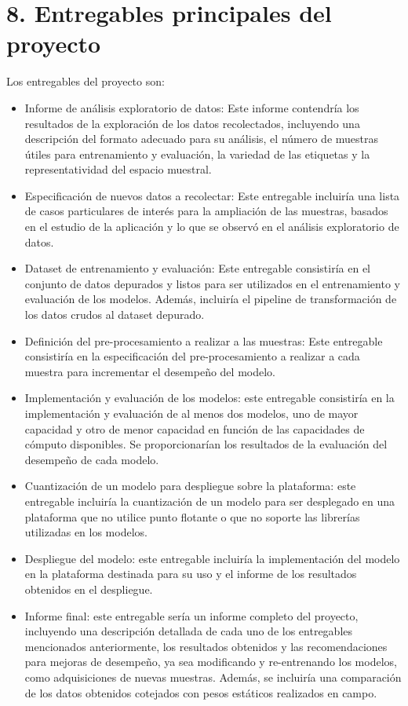 \documentclass[
11pt, %
codirector, %
]{charter}
\begin{document}
\section{8. Entregables principales del proyecto}
\label{sec:entregables}



Los entregables del proyecto son:

\begin{itemize}
	\item Informe de análisis exploratorio de datos: Este informe contendría los resultados de la exploración de los datos recolectados, incluyendo una descripción del formato adecuado para su análisis, el número de muestras útiles para entrenamiento y evaluación, la variedad de las etiquetas y la representatividad del espacio muestral.
	\item Especificación de nuevos datos a recolectar: Este entregable incluiría una lista de casos particulares de interés para la ampliación de las muestras, basados en el estudio de la aplicación y lo que se observó en el análisis exploratorio de datos.
	\item Dataset de entrenamiento y evaluación: Este entregable consistiría en el conjunto de datos depurados y listos para ser utilizados en el entrenamiento y evaluación de los modelos. Además, incluiría el pipeline de transformación de los datos crudos al dataset depurado.
	\item Definición del pre-procesamiento a realizar a las muestras: Este entregable consistiría en la especificación del pre-procesamiento a realizar a cada muestra para incrementar el desempeño del modelo.
	\item Implementación y evaluación de los modelos: este entregable consistiría en la implementación y evaluación de al menos dos modelos, uno de mayor capacidad y otro de menor capacidad en función de las capacidades de cómputo disponibles. Se proporcionarían los resultados de la evaluación del desempeño de cada modelo.
	\item Cuantización de un modelo para despliegue sobre la plataforma: este entregable incluiría la cuantización de un modelo para ser desplegado en una plataforma que no utilice punto flotante o que no soporte las librerías utilizadas en los modelos.
	\item Despliegue del modelo: este entregable incluiría la implementación del modelo en la plataforma destinada para su uso y el informe de los resultados obtenidos en el despliegue.
	\item Informe final: este entregable sería un informe completo del proyecto, incluyendo una descripción detallada de cada uno de los entregables mencionados anteriormente, los resultados obtenidos y las recomendaciones para mejoras de desempeño, ya sea modificando y re-entrenando los modelos, como adquisiciones de nuevas muestras. Además, se incluiría una comparación de los datos obtenidos cotejados con pesos estáticos realizados en campo.
\end{itemize}
\end{document}
